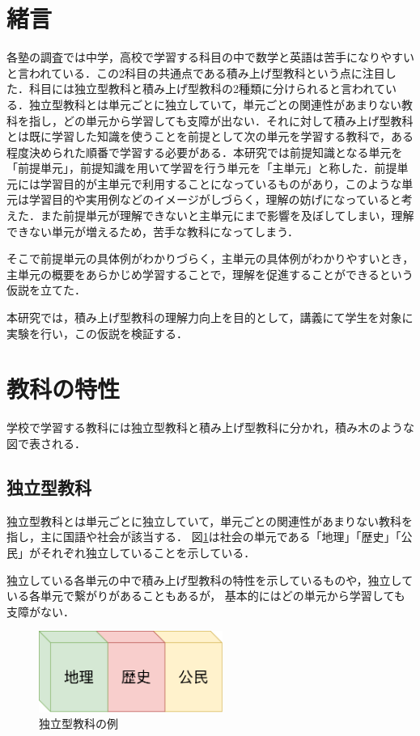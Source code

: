 \documentclass[a4j,12pt]{jsarticle}
\begin{document}
\newpage
\section{緒言}


各塾の調査では中学，高校で学習する科目の中で数学と英語は苦手になりやすいと言われている\cite{1}．この2科目の共通点である積み上げ型教科という点に注目した．科目には独立型教科と積み上げ型教科の2種類に分けられると言われている．独立型教科とは単元ごとに独立していて，単元ごとの関連性があまりない教科を指し，どの単元から学習しても支障が出ない．それに対して積み上げ型教科とは既に学習した知識を使うことを前提として次の単元を学習する教科で，ある程度決められた順番で学習する必要がある．本研究では前提知識となる単元を「前提単元」，前提知識を用いて学習を行う単元を「主単元」と称した．前提単元には学習目的が主単元で利用することになっているものがあり，このような単元は学習目的や実用例などのイメージがしづらく，理解の妨げになっていると考えた．また前提単元が理解できないと主単元にまで影響を及ぼしてしまい，理解できない単元が増えるため，苦手な教科になってしまう．

そこで前提単元の具体例がわかりづらく，主単元の具体例がわかりやすいとき，主単元の概要をあらかじめ学習することで，理解を促進することができるという仮説を立てた．

本研究では，積み上げ型教科の理解力向上を目的として，講義にて学生を対象に実験を行い，この仮説を検証する．

\newpage
\section{教科の特性}
学校で学習する教科には独立型教科と積み上げ型教科に分かれ，積み木のような図で表される．\\


\subsection{独立型教科}
独立型教科とは単元ごとに独立していて，単元ごとの関連性があまりない教科を指し，主に国語や社会が該当する．
図\ref{fig:01}は社会の単元である「地理」「歴史」「公民」がそれぞれ独立していることを示している．

独立している各単元の中で積み上げ型教科の特性を示しているものや，独立している各単元で繋がりがあることもあるが，
基本的にはどの単元から学習しても支障がない．\\
\begin{figure}[H]
\centering
\includegraphics[width=6cm]{01.pdf}
\caption{独立型教科の例}
\label{fig:01}
\end{figure} 
\end{document}
